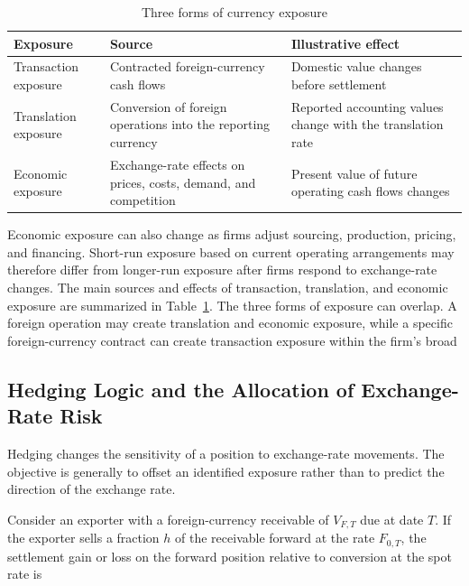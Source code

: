 \begin{table}[htbp]
\centering
\caption{Three forms of currency exposure}
\label{tab:ch10-currency-exposure-types}

\begin{tabularx}{\textwidth}{@{}p{3.1cm}X X@{}}
\toprule
\textbf{Exposure}
& \textbf{Source}
& \textbf{Illustrative effect} \\
\midrule

Transaction exposure
& Contracted foreign-currency cash flows
& Domestic value changes before settlement \\

Translation exposure
& Conversion of foreign operations into the reporting currency
& Reported accounting values change with the translation rate \\

Economic exposure
& Exchange-rate effects on prices, costs, demand, and competition
& Present value of future operating cash flows changes \\

\bottomrule
\end{tabularx}
\end{table}

Economic exposure can also change as firms adjust sourcing, production, pricing, and financing. Short-run exposure based on current operating arrangements may therefore differ from longer-run exposure after firms respond to exchange-rate changes. The main sources and effects of transaction, translation, and economic exposure are summarized in Table~\ref{tab:ch10-currency-exposure-types}.
The three forms of exposure can overlap. A foreign operation may create translation and economic exposure, while a specific foreign-currency contract can create transaction exposure within the firm's broad


\subsection{Hedging Logic and the Allocation of Exchange-Rate Risk}

Hedging changes the sensitivity of a position to exchange-rate movements. The objective is generally to offset an identified exposure rather than to predict the direction of the exchange rate.

Consider an exporter with a foreign-currency
receivable of $V_{F,T}$ due at date $T$. If the
exporter sells a fraction $h$ of the receivable
forward at the rate $F_{0,T}$, the settlement
gain or loss on the forward position relative
to conversion at the spot rate is

